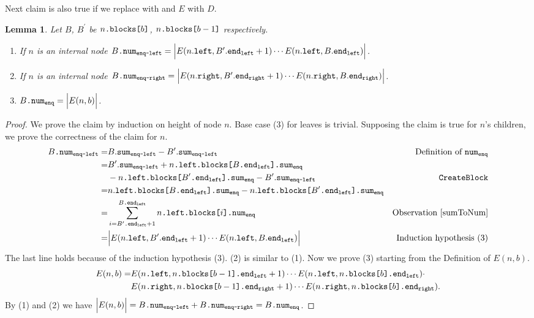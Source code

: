 \documentclass[10pt]{article}
\newcommand{\sub}[1]{\textsubscript{#1}}
\newcommand{\nf}[1]{{\normalfont{\texttt{#1}}}}
\newtheorem{lemma}[theorem]{Lemma}
\theoremstyle{definition}
\begin{document}
Next claim is also true if we replace \nf{enq} with \nf{deq} and $E$ with $D$.
\begin{lemma}\label{lem::numX}
Let $B$, $B^\prime$ be $n\nf{.blocks[}b\nf{]}$, $n\nf{.blocks[}b-1\nf{]}$ respectively.
\begin{enumerate}[label=(\arabic*)]
    \item If $n$ is an internal node $B\nf{.num\sub{enq-left}}=\Big|E(n.\nf{left},B^\prime.\nf{end\sub{left}}+1)\cdots E(n.\nf{left},B.\nf{end\sub{left}})\Big|$.
    \item If $n$ is an internal node $B\nf{.num\sub{enq-right}}=\Big|E(n.\nf{right},B^\prime.\nf{end\sub{right}}+1)\cdots E(n.\nf{right},B.\nf{end\sub{right}})\Big|$.
    \item $B\nf{.num\sub{enq}}=\Big|E(n,b)\Big|$.
\end{enumerate}
\end{lemma}
\begin{proof}
 We prove the claim by induction on height of node $n$. Base case (3) for leaves is trivial. Supposing the claim is true for $n$'s children, we prove the correctness of the claim for $n$.
\begin{align*}
    B\nf{.num\sub{enq-left}}=&B.\nf{sum\sub{enq-left}}-B^\prime.\nf{sum\sub{enq-left}}& \text{Definition of }\nf{num\sub{enq}}\\
    =& B^\prime.\nf{sum\sub{enq-left}}+n\nf{.left.blocks[}B\nf{.end\sub{left}].sum\sub{enq}}\\&-n\nf{.left.blocks[}B^\prime\nf{.end\sub{left}].sum\sub{enq}}-B^\prime.\nf{sum\sub{enq-left}} & \nf{CreateBlock}\\
    =& n.\nf{left.blocks[}B\nf{.end\sub{left}].sum\sub{enq}}- n.\nf{left.blocks[}B^\prime\nf{.end\sub{left}].sum\sub{enq}}\\
    =& \sum_{i=B^\prime\nf{.end\sub{left}}+1}^{B\nf{.end\sub{left}}}  n\nf{.left.blocks[}i\nf{].num\sub{enq}} &\text{Observation } \ref{sumToNum}\\
    =& \Big|E(n.\nf{left},B^\prime.\nf{end\sub{left}}+1)\cdots E(n.\nf{left},B.\nf{end\sub{left}})\Big| & \textrm{Induction hypothesis (3)}
\end{align*}
The last line holds because of the induction hypothesis (3). (2) is similar to (1). Now we prove (3) starting from the Definition of $E(n,b)$.
\begin{align*} 
E(n,b) =&  E(n\nf{.left},n\nf{.blocks[}b-1\nf{].end\sub{left}}+1)\cdots E(n\nf{.left},n\nf{.blocks[}b\nf{].end\sub{left}})\cdot \\ 
&E(n\nf{.right},n\nf{.blocks[}b-1\nf{].end\sub{right}}+1)\cdots E(n\nf{.right},n\nf{.blocks[}b\nf{].end\sub{right}}).
\end{align*}
By (1) and (2) we have $\Big|E(n,b)\Big|=B\nf{.num\sub{enq-left}}+B\nf{.num\sub{enq-right}}=B\nf{.num\sub{enq}}$.
\end{proof}
\end{document}
